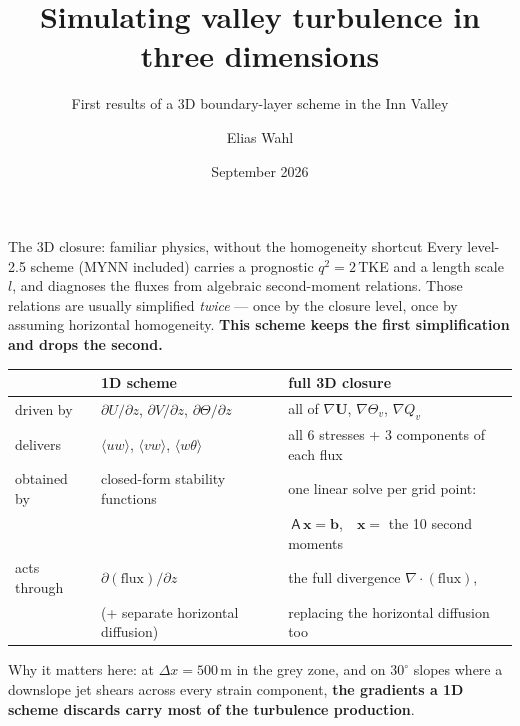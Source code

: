 \documentclass[10pt,aspectratio=169]{beamer}
\title{Simulating valley turbulence in three dimensions}
\subtitle{First results of a 3D boundary-layer scheme in the Inn Valley}
\author{Elias Wahl}
\institute{University of Innsbruck}
\date{September 2026}
\begin{document}
\begin{frame}
  \titlepage
\end{frame}

\begin{frame}{The 3D closure: familiar physics, without the homogeneity shortcut}
  Every level-2.5 scheme (MYNN included) carries a prognostic
  $q^2 = 2\,$TKE and a length scale $l$, and diagnoses the fluxes from
  algebraic second-moment relations. Those relations are usually simplified
  \emph{twice} --- once by the closure level, once by assuming horizontal
  homogeneity. \textbf{This scheme keeps the first simplification and drops
  the second.}
  \vspace{1ex}
  \begin{center}
  \begin{tabular}{@{}lll@{}}
    \toprule
     & 1D scheme & full 3D closure \\
    \midrule
    driven by & $\partial U/\partial z$, $\partial V/\partial z$,
      $\partial\Theta/\partial z$ & all of $\nabla\mathbf{U}$, $\nabla\Theta_v$,
      $\nabla Q_v$ \\
    delivers & $\langle uw\rangle$, $\langle vw\rangle$,
      $\langle w\theta\rangle$ & all 6 stresses + 3 components of each flux \\
    obtained by & closed-form stability functions & one linear solve per grid
      point: \\
     & & $\ \mathsf{A}\,\mathbf{x}=\mathbf{b}$,\ \ $\mathbf{x} =$ the 10 second
      moments \\
    acts through & $\partial(\text{flux})/\partial z$ & the full divergence
      $\nabla\!\cdot(\text{flux})$, \\
     & (+ separate horizontal diffusion) & replacing the horizontal diffusion too \\
    \bottomrule
  \end{tabular}
  \end{center}
  \vspace{1ex}
  Why it matters here: at $\Delta x = 500$\,m in the grey zone, and on
  $30^\circ$ slopes where a downslope jet shears across every strain
  component, \textbf{the gradients a 1D scheme discards carry most of the
  turbulence production}.
\end{frame}
\end{document}

